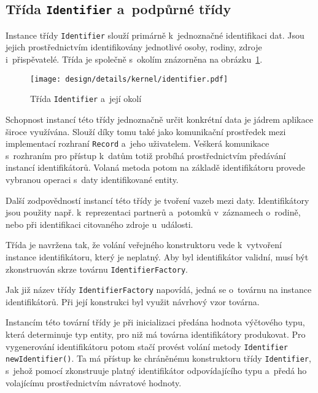 		\subsection*{Třída \texttt{Identifier} a~podpůrné třídy}
		Instance třídy \texttt{Identifier} slouží primárně k~jednoznačné identifikaci dat. Jsou jejich prostřednictvím identifikovány jednotlivé osoby, rodiny, zdroje i~přispěvatelé. Třída je společně s~okolím znázorněna na obrázku~\ref{fig:designDetailIdentifier}.\par
		\begin{figure}[h]
			\centering
			\texttt{[image: design/details/kernel/identifier.pdf]}
			\caption{Třída \texttt{Identifier} a~její okolí}
			\label{fig:designDetailIdentifier}
		\end{figure}
		Schopnost instancí této třídy jednoznačně určit konkrétní data je jádrem aplikace široce využívána. Slouží díky tomu také jako komunikační prostředek mezi implementací rozhraní \texttt{Record} a~jeho uživatelem. Veškerá komunikace s~rozhraním pro přístup k~datům totiž probíhá prostřednictvím předávání instancí identifikátorů. Volaná metoda potom na základě identifikátoru provede vybranou operaci s~daty identifikované entity. \par
		Další zodpovědností instancí této třídy je tvoření vazeb mezi daty. Identifikátory jsou použity např. k~reprezentaci partnerů a~potomků v~záznamech o~rodině, nebo při identifikaci citovaného zdroje u~události. \par
		Třída je navržena tak, že volání veřejného konstruktoru vede k~vytvoření instance identifikátoru, který je neplatný. Aby byl identifikátor validní, musí být zkonstruován skrze továrnu \texttt{IdentifierFactory}. \par
		Jak již název třídy \texttt{IdentifierFactory} napovídá, jedná se o~továrnu na instance identifikátorů. Při její konstrukci byl využit návrhový vzor továrna. \par
		Instancím této tovární třídy je při inicializaci předána hodnota výčtového typu, která determinuje typ entity, pro niž má továrna identifikátory produkovat. Pro vygenerování identifikátoru potom stačí provést volání metody \texttt{Identifier newIdentifier()}. Ta má přístup ke chráněnému konstruktoru třídy \texttt{Identifier}, s~jehož pomocí zkonstruuje platný identifikátor odpovídajícího typu a~předá ho volajícímu prostřednictvím návratové hodnoty.\par
		
